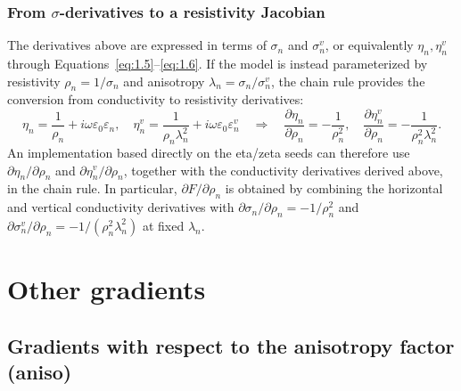 \documentclass[12pt]{report}
\begin{document}
\subsection{From \(\sigma\)-derivatives to a resistivity Jacobian}
\label{sec:res-code-crosscheck}

The derivatives above are expressed in terms of \(\sigma_n\) and
\(\sigma_n^v\), or equivalently \(\eta_n,\eta_n^v\) through
Equations~\eqref{eq:1.5}--\eqref{eq:1.6}. If the model is instead
parameterized by resistivity \(\rho_n=1/\sigma_n\) and anisotropy
\(\lambda_n=\sigma_n/\sigma_n^v\), the chain rule provides the conversion
from conductivity to resistivity derivatives:
\begin{equation}
    \eta_n = \frac{1}{\rho_n} + i\omega\varepsilon_0\varepsilon_n, \quad
    \eta^v_n = \frac{1}{\rho_n\lambda_n^2} + i\omega\varepsilon_0\varepsilon^v_n
    \quad\Longrightarrow\quad
    \frac{\partial\eta_n}{\partial\rho_n} = -\frac{1}{\rho_n^2}, \quad
    \frac{\partial\eta^v_n}{\partial\rho_n} = -\frac{1}{\rho_n^2\lambda_n^2}.
    \label{eq:res-code-seed}
\end{equation}
An implementation based directly on the eta/zeta seeds can therefore use
\(\partial\eta_n/\partial\rho_n\) and
\(\partial\eta_n^v/\partial\rho_n\), together with the conductivity
derivatives derived above, in the chain rule. In particular,
\(\partial F/\partial\rho_n\) is obtained by combining the horizontal and
vertical conductivity derivatives with
\(\partial\sigma_n/\partial\rho_n=-1/\rho_n^2\) and
\(\partial\sigma_n^v/\partial\rho_n=-1/(\rho_n^2\lambda_n^2)\) at fixed
\(\lambda_n\).

\chapter{Other gradients}

{\centering
}

\section{Gradients with respect to the anisotropy factor (aniso)}
\end{document}
